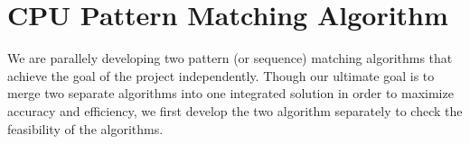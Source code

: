 \section{CPU Pattern Matching Algorithm}
\label{sec:algorithms}

We are parallely developing two  pattern (or sequence) matching algorithms that achieve the goal of the project independently. Though our ultimate goal is to merge two separate algorithms into one integrated solution in order to maximize accuracy and efficiency, we first develop the two algorithm separately to check the feasibility of the algorithms.


